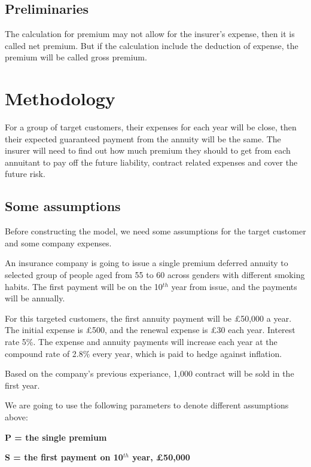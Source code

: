 \documentclass{report}
\begin{document}
\subsection{Preliminaries}

The calculation for premium may not allow for the insurer's expense, then it is called net premium. But if the calculation include the deduction of expense, the premium will be called gross premium.





\section{Methodology}


For a group of target customers, their expenses for each year will be close, then their expected guaranteed payment from the annuity will be the same. The insurer will need to find out how much premium they should to get from each annuitant to pay off the future liability, contract related expenses and cover the future risk.

\subsection{Some assumptions}

Before constructing the model, we need some assumptions for the target customer and some company expenses.

An insurance company is going to issue a single premium deferred annuity to selected group of people aged from 55 to 60 across genders with different smoking habits. The first payment will be on the 10$^{th}$ year from issue, and the payments will be annually.

For this targeted customers, the first annuity payment will be \pounds 50,000 a year. The initial expense is \pounds500, and the renewal expense is \pounds30 each year. Interest rate 5\%. The expense and annuity payments will increase each year at the compound rate of 2.8\% every year, which is paid to hedge against inflation.

Based on the company's previous experiance, 1,000 contract will be sold in the first year. 

We are going to use the following parameters to denote different assumptions above:

\textbf{P = the single premium}

\textbf{S = the first payment on 10$^{th}$ year, \pounds50,000}
\end{document}

